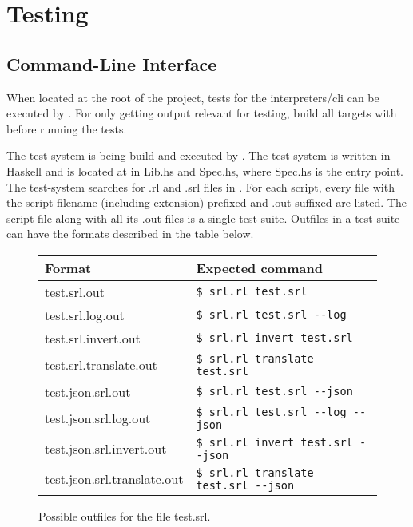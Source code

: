 \section{Testing}


\subsection{Command-Line Interface}

When located at the root of the project, tests for the interpreters/cli can be executed by .
For only getting output relevant for testing, build all targets with  before running the tests.

The test-system is being build and executed by .
The test-system is written in Haskell and is located at  in Lib.hs and Spec.hs, where Spec.hs is the entry point.
The test-system searches for .rl and .srl files in .
For each script, every file with the script filename (including extension) prefixed and .out suffixed are listed.
The script file along with all its .out files is a single test suite.
Outfiles in a test-suite can have the formats described in the table below.

\begin{figure}[H]
  \center
  \begin{tabular}{|l|l|}\hline
    \textbf{Format}             & \textbf{Expected command}\\\hline
    test.srl.out                & \texttt{\$ srl.rl test.srl}\\\hline
    test.srl.log.out            & \texttt{\$ srl.rl test.srl {-}{-}log}\\\hline
    test.srl.invert.out         & \texttt{\$ srl.rl invert test.srl}\\\hline
    test.srl.translate.out      & \texttt{\$ srl.rl translate test.srl}\\\hline
    test.json.srl.out           & \texttt{\$ srl.rl test.srl {-}{-}json}\\\hline
    test.json.srl.log.out       & \texttt{\$ srl.rl test.srl {-}{-}log {-}{-}json}\\\hline
    test.json.srl.invert.out    & \texttt{\$ srl.rl invert test.srl {-}{-}json}\\\hline
    test.json.srl.translate.out & \texttt{\$ srl.rl translate test.srl {-}{-}json}\\\hline
  \end{tabular}
  \caption{Possible outfiles for the file test.srl.}
  \label{fig:test_suite_formats}
\end{figure}

